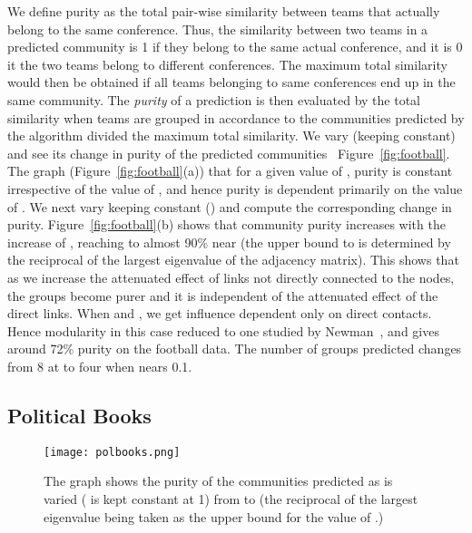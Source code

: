 \documentclass{sig-alternate}
\newcommand{\figref}[1]{Figure~\ref{#1}}
\begin{document}
We define purity as the total pair-wise similarity between teams that actually belong to the same conference. Thus, the similarity between two teams in a predicted community is 1 if they belong to the same actual conference, and it is 0 it the two teams belong to different conferences. The maximum total similarity would then be obtained if all teams belonging to same conferences end up in the same community. The \emph{purity} of a prediction is then evaluated by the total similarity when teams are grouped in accordance to the communities predicted by the algorithm divided the maximum total similarity. We vary  (keeping  constant) and see its change in purity of the predicted communities ~\figref{fig:football}. The graph (\figref{fig:football}(a)) that for a given value of ,  purity is constant irrespective of the value of , and  hence  purity is dependent primarily on the value of . We next  vary  keeping   constant () and compute the corresponding change in purity. \figref{fig:football}(b) shows that community purity increases with the increase of , reaching to almost 90\% near  (the upper  bound to  is determined by the reciprocal of the largest eigenvalue of the adjacency matrix).  This shows that as we increase the attenuated effect of links not directly connected to the nodes, the groups become purer and it is independent of the attenuated effect of the direct links. When  and ,  we get influence dependent only on direct contacts. Hence modularity in this case reduced to one studied by Newman~\cite{Newman206}, and gives around 72\% purity on the football data. The number of groups predicted changes from 8 at  to four when  nears 0.1.

\subsection{Political Books}
  \begin{figure}[tbh]
\texttt{[image: polbooks.png]}
 \caption{The graph shows the purity of the communities predicted as  is varied (  is kept constant at 1) from  to  (the reciprocal of the largest eigenvalue being taken as the upper bound for the value of .)}
 \label{fig:polbooks}
 \end{figure}
\end{document}
